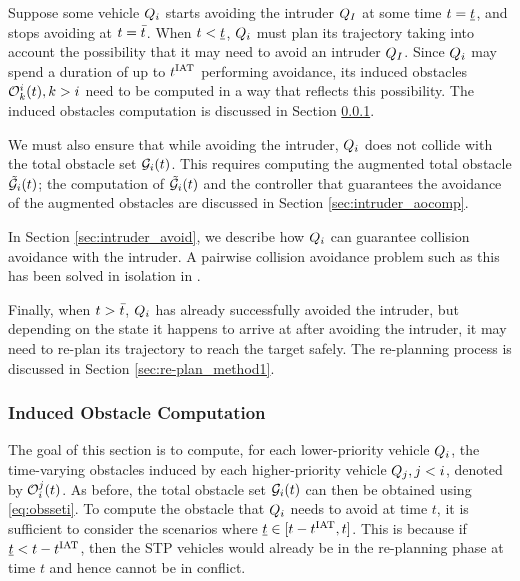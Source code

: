 Suppose some vehicle $Q_i$ starts avoiding the intruder $Q_{I}$ at some time $t = \underline{t}$, and stops avoiding at $t = \bar{t}$. When $t < \underline{t}$, $Q_i$ must plan its trajectory taking into account the possibility that it may need to avoid an intruder $Q_I$. Since $Q_i$ may spend a duration of up to $t^\text{IAT}$ performing avoidance, its induced obstacles $\mathcal{O}_k^i(t), k>i$ need to be computed in a way that reflects this possibility. The induced obstacles computation is discussed in Section \ref{sec:intruder_iocomp}.

We must also ensure that while avoiding the intruder, $Q_i$ does not collide with the total obstacle set $\mathcal{G}_i(t)$. This requires computing the augmented total obstacle $\tilde{\mathcal{G}}_i(t)$; the computation of $\tilde{\mathcal{G}}_i(t)$ and the controller that guarantees the avoidance of the augmented obstacles are discussed in Section \ref{sec:intruder_aocomp}.

In Section \ref{sec:intruder_avoid}, we describe how $Q_i$ can guarantee collision avoidance with the intruder. A pairwise collision avoidance problem such as this has been solved in isolation in \cite{Mitchell05}.

Finally, when $t > \bar{t}$, $Q_i$ has already successfully avoided the intruder, but depending on the state it happens to arrive at after avoiding the intruder, it may need to re-plan its trajectory to reach the target safely. The re-planning process is discussed in Section \ref{sec:re-plan_method1}.

\subsubsection{Induced Obstacle Computation} \label{sec:intruder_iocomp}
The goal of this section is to compute, for each lower-priority vehicle $Q_i$, the time-varying obstacles induced by each higher-priority vehicle $Q_j, j < i$, denoted by $\mathcal{O}_i^j(t)$. As before, the total obstacle set $\mathcal{G}_i(t)$ can then be obtained using \eqref{eq:obsseti}. To compute the obstacle that $Q_i$ needs to avoid at time $t$, it is sufficient to consider the scenarios where $\underline{t} \in [t-t^\text{IAT}, t]$. This is because if $\underline{t} < t - t^\text{IAT}$, then the STP vehicles would already be in the re-planning phase at time $t$ and hence cannot be in conflict. 

